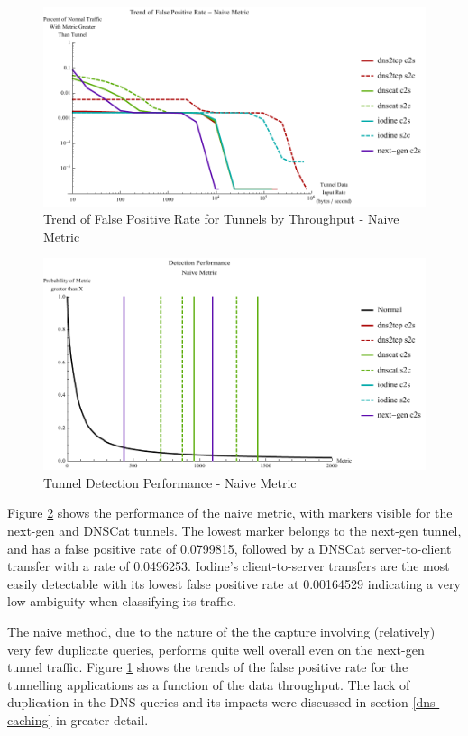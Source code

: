 \documentclass[12pt]{report}
\theoremstyle{remark}
\theoremstyle{definition}
\theoremstyle{definition}
\theoremstyle{definition}
\begin{document}
\begin{figure}
\centering
\includegraphics[width=\textwidth]{figures/cnplot.pdf}
\caption[Trend of False Positive Rate for Tunnels by Throughput - Naive 
Metric]{Trend of False Positive Rate for Tunnels by Throughput - Naive Metric}
\label{cnplot}
\end{figure}

\begin{figure}
\centering
\includegraphics[width=\textwidth]{figures/mpnv.pdf}
\caption[Tunnel Detection Performance - Naive Metric]{Tunnel Detection 
Performance - Naive Metric}
\label{mpnv}
\end{figure}

Figure \ref{mpnv} shows the performance of the naive metric, with markers
visible for the next-gen and DNSCat tunnels. The lowest marker belongs to the
next-gen tunnel, and has a false positive rate of 0.0799815, followed by a
DNSCat server-to-client transfer with a rate of 0.0496253. Iodine's
client-to-server transfers are the most easily detectable with its lowest false
positive rate at 0.00164529 indicating a very low ambiguity when classifying its
traffic.

The naive method, due to the nature of the the capture involving (relatively)
very few duplicate queries, performs quite well overall even on the next-gen
tunnel traffic. Figure \ref{cnplot} shows the trends of the false positive rate
for the tunnelling applications as a function of the data throughput. The lack
of duplication in the DNS queries and its impacts were discussed in section
\ref{dns-caching} in greater detail.
\end{document}
